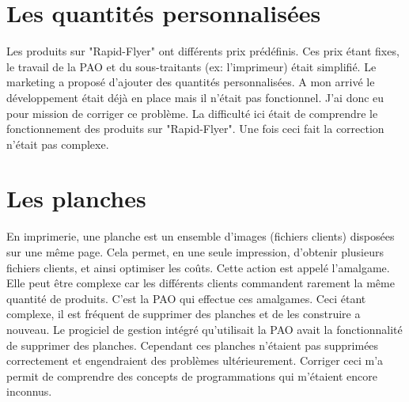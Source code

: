 \section{Les quantités personnalisées}
Les produits sur "Rapid-Flyer" ont différents prix prédéfinis. Ces prix étant fixes, le travail de la PAO et du sous-traitants (ex: l'imprimeur) était simplifié.\newline
Le marketing a proposé d'ajouter des quantités personnalisées. A mon arrivé le développement était déjà en place mais il n'était pas fonctionnel. J'ai donc eu pour mission de corriger ce problème. La difficulté ici était de comprendre le fonctionnement des produits sur "Rapid-Flyer". Une fois ceci fait la correction n'était pas complexe.

\section{Les planches}
En imprimerie, une planche est un ensemble d'images (fichiers clients) disposées sur une même page. Cela permet, en une seule impression, d'obtenir plusieurs fichiers clients, et ainsi optimiser les coûts. Cette action est appelé l'amalgame. Elle peut être complexe car les différents clients commandent rarement la même quantité de produits. C'est la PAO qui effectue ces amalgames. Ceci étant complexe, il est fréquent de supprimer des planches et de les construire a nouveau.\newline
Le progiciel de gestion intégré qu'utilisait la PAO avait la fonctionnalité de supprimer des planches. Cependant ces planches n'étaient pas supprimées correctement et engendraient des problèmes ultérieurement. Corriger ceci m'a permit de comprendre des concepts de programmations qui m'étaient encore inconnus.